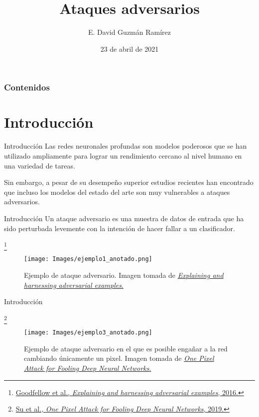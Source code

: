 \documentclass[10pt]{beamer}
\title[Ataques adversarios]{Ataques adversarios} %
\author[IIMAS, UNAM]{E. David Guzmán Ramírez} %
\institute[] %
{	Licenciatura en Ciencia de Datos \\
	Introducción al Aprendizaje Profundo \\ \medskip M. en C. Berenice Montalvo Lezama \\ M. en C. Ricardo Montalvo Lezama
}
\date{{\tiny 23 de abril de 2021}} %
\newcommand\blfootnote[1]{%
  \begingroup
  \renewcommand\thefootnote{}\footnote{#1}%
  \addtocounter{footnote}{-1}%
  \endgroup
}
\begin{document}
	
	
\begin{frame}
	\titlepage %
\end{frame}

\begin{frame}
\frametitle{Contenidos}
\justify

\tableofcontents
\end{frame}

\section{Introducción}
\begin{frame}{Introducción}
\justify
\small
Las redes neuronales profundas son modelos poderosos que se han utilizado ampliamente para lograr un rendimiento cercano al nivel humano en una variedad de tareas. \medskip

Sin embargo, a pesar de su desempeño superior estudios recientes han encontrado que incluso los modelos del estado del arte son muy vulnerables a ataques adversarios.
\end{frame}

\begin{frame}{Introducción}
\justify
\small
Un ataque adversario es una muestra de datos de entrada que ha sido perturbada levemente con la intención de hacer fallar a un clasificador. 

\blfootnote{\vspace*{0.3cm} \href{https://arxiv.org/pdf/1412.6572.pdf}{Goodfellow et al., \emph{Explaining and harnessing adversarial examples}, 2016.}}

\begin{figure}
\centering
\texttt{[image: Images/ejemplo1\_anotado.png]}
\caption{Ejemplo de ataque adversario. Imagen tomada de \href{https://arxiv.org/pdf/1412.6572.pdf}{\emph{Explaining and harnessing adversarial examples}.}}
\end{figure}

\end{frame}

\begin{frame}{Introducción}
\justify
\small

\blfootnote{\vspace*{0.3cm} \href{https://arxiv.org/pdf/1412.6572.pdf}{Su et al., \emph{One Pixel Attack for Fooling Deep Neural Networks}, 2019.}}

\begin{figure}
\centering
\texttt{[image: Images/ejemplo3\_anotado.png]}
\caption{Ejemplo de ataque adversario en el que es posible engañar a la red cambiando únicamente un pixel. Imagen tomada de \href{https://arxiv.org/pdf/1710.08864.pdf}{\emph{One Pixel Attack for Fooling Deep Neural Networks}.}}
\end{figure}

\end{frame}
\end{document}
